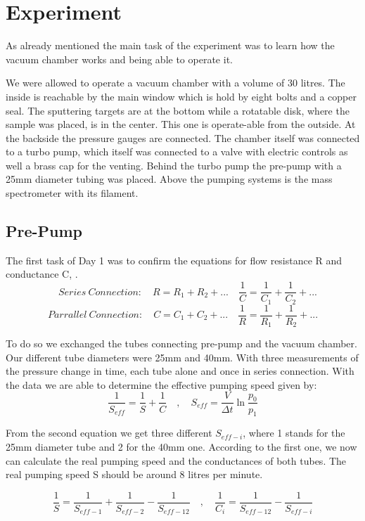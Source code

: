 \documentclass[]{article}
\begin{document}
\newpage
\section{Experiment}
As already mentioned the main task of the experiment was to learn how the vacuum chamber works and being able to operate it. 

We were allowed to operate a vacuum chamber with a volume of 30 litres. The inside is reachable by the main window which is hold by eight bolts and a copper seal. The sputtering targets are at the bottom while a rotatable disk, where the sample was placed, is in the center. This one is operate-able from the outside. At the backside the pressure gauges are connected. 
The chamber itself was connected to a turbo pump, which itself was connected to a valve with electric controls as well a brass cap for the venting. Behind the turbo pump the pre-pump with a 25mm diameter tubing was placed. Above the pumping systems is the mass spectrometer with its filament.

\newpage

\subsection{Pre-Pump}
The first task of Day 1 was to confirm the equations for flow resistance R and conductance C, \cite[Page 91]{VacuumHandbook}. 
\[ \quad Series \: Connection: \quad
R = R_1 + R_2 + ...  \quad \frac{1}{C} = \frac{1}{C_1} + \frac{1}{C_2} + ... \]
\[ Parrallel \: Connection: \quad
C = C_1 + C_2 + ...  \quad \frac{1}{R} = \frac{1}{R_1} + \frac{1}{R_2} + ... \]

To do so we exchanged the tubes connecting pre-pump and the vacuum chamber. Our different tube diameters were 25mm and 40mm. With three measurements of the pressure change in time, each tube alone and once in series connection. With the data we are able to determine the effective pumping speed \cite[Page 93]{VacuumHandbook} given by:
\[ \frac{1}{S_{eff}} = \frac{1}{S} + \frac{1}{C} \quad , \quad
S_{eff} = \frac{V}{\Delta t} \ln{ \frac{p_0}{p_1} } \]

From the second equation we get three different $S_{eff-i}$, where 1 stands for the 25mm diameter tube and 2 for the 40mm one. According to the first one, we now can calculate the real pumping speed and the conductances of both tubes. The real pumping speed S should be around 8 litres per minute.

\[ \frac{1}{S} = \frac{1}{S_{eff-1}} + \frac{1}{S_{eff-2}} -\frac{1}{S_{eff-12}} \quad , \quad
\frac{1}{C_i} = \frac{1}{S_{eff-12}} - \frac{1}{S_{eff-i}} \]
\end{document}
